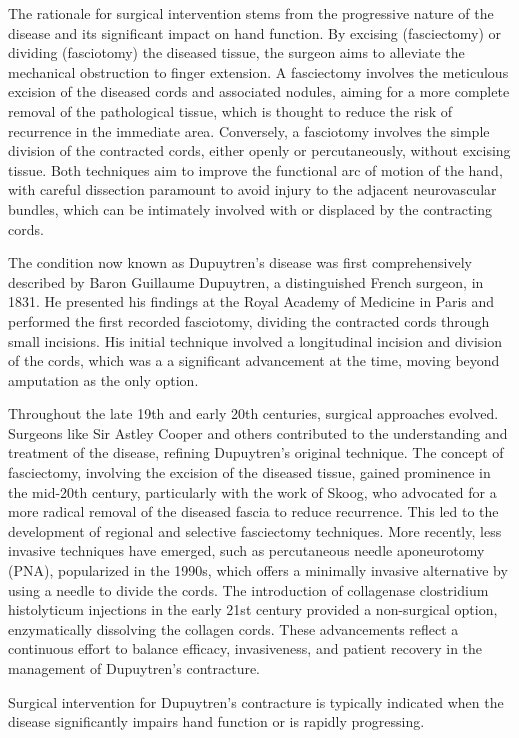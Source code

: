 The rationale for surgical intervention stems from the progressive nature of the disease and its significant impact on hand function. By excising (fasciectomy) or dividing (fasciotomy) the diseased tissue, the surgeon aims to alleviate the mechanical obstruction to finger extension. A fasciectomy involves the meticulous excision of the diseased cords and associated nodules, aiming for a more complete removal of the pathological tissue, which is thought to reduce the risk of recurrence in the immediate area. Conversely, a fasciotomy involves the simple division of the contracted cords, either openly or percutaneously, without excising tissue. Both techniques aim to improve the functional arc of motion of the hand, with careful dissection paramount to avoid injury to the adjacent neurovascular bundles, which can be intimately involved with or displaced by the contracting cords.

The condition now known as Dupuytren's disease was first comprehensively described by Baron Guillaume Dupuytren, a distinguished French surgeon, in 1831. He presented his findings at the Royal Academy of Medicine in Paris and performed the first recorded fasciotomy, dividing the contracted cords through small incisions. His initial technique involved a longitudinal incision and division of the cords, which was a a significant advancement at the time, moving beyond amputation as the only option.

Throughout the late 19th and early 20th centuries, surgical approaches evolved. Surgeons like Sir Astley Cooper and others contributed to the understanding and treatment of the disease, refining Dupuytren's original technique. The concept of fasciectomy, involving the excision of the diseased tissue, gained prominence in the mid-20th century, particularly with the work of Skoog, who advocated for a more radical removal of the diseased fascia to reduce recurrence. This led to the development of regional and selective fasciectomy techniques. More recently, less invasive techniques have emerged, such as percutaneous needle aponeurotomy (PNA), popularized in the 1990s, which offers a minimally invasive alternative by using a needle to divide the cords. The introduction of collagenase clostridium histolyticum injections in the early 21st century provided a non-surgical option, enzymatically dissolving the collagen cords. These advancements reflect a continuous effort to balance efficacy, invasiveness, and patient recovery in the management of Dupuytren's contracture.

Surgical intervention for Dupuytren's contracture is typically indicated when the disease significantly impairs hand function or is rapidly progressing.


